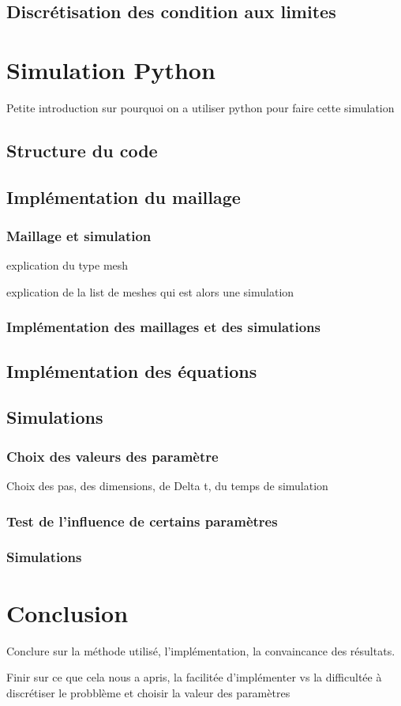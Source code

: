 \documentclass[fleqn]{article}
\begin{document}
\subsection{Discrétisation des condition aux limites}



\newpage
\section{Simulation Python} 
Petite introduction sur pourquoi on a utiliser python pour faire cette simulation
\subsection{Structure du code}
\subsection{Implémentation du maillage}
\subsubsection{Maillage et simulation}
explication du type mesh

explication de la list de meshes qui est alors une simulation
\subsubsection{Implémentation des maillages et des simulations}
\subsection{Implémentation des équations}
\subsection{Simulations}
\subsubsection{Choix des valeurs des paramètre}
Choix des pas, des dimensions, de Delta t, du temps de simulation
\subsubsection{Test de l'influence de certains paramètres}
\subsubsection{Simulations}

\newpage
\section{Conclusion}
Conclure sur la méthode utilisé, l'implémentation, la convaincance des résultats.

Finir sur ce que cela nous a apris, la facilitée d'implémenter vs la difficultée à discrétiser le probblème et choisir la valeur des paramètres
\end{document}
